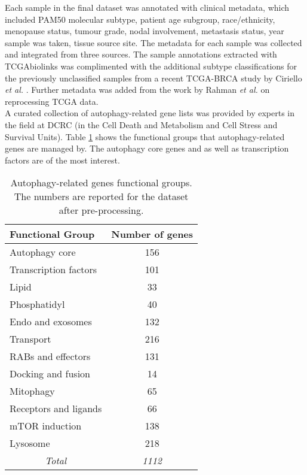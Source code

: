     
    Each sample in the final dataset was annotated with clinical metadata, which included PAM50 molecular subtype, patient age subgroup, race/ethnicity, menopause status, tumour grade, nodal involvement, metastasis status, year sample was taken, tissue source site. 
    The metadata for each sample was collected and integrated from three sources. The sample annotations extracted with TCGAbiolinks was complimented with the additional subtype classifications for the previously unclassified samples from a recent TCGA-BRCA study by Ciriello \textit{et al.} \cite{Ciriello2015ComprehensiveCancer}. Further metadata was added from the work by Rahman \textit{et al. }\cite{RahmanAlternativeResults} on reprocessing TCGA data. \\   
    
        
    A curated collection of autophagy-related gene lists was provided by experts in the field at DCRC (in the Cell Death and Metabolism and Cell Stress and Survival Units). Table \ref{table:autophagy} shows the functional groups that autophagy-related genes are managed by. The autophagy core genes and as well as transcription factors are of the most interest. 
    
    
            \begin{table}[!htbp]
            \centering
            \caption{Autophagy-related genes functional groups. The numbers are reported for the dataset after pre-processing.}
            \label{table:autophagy}
            \begin{tabular}{l|c}
            \textbf{Functional Group} & \multicolumn{1}{l}{\textbf{Number of genes}} \\ \hline
            Autophagy core & 156 \\ \hline
            Transcription factors & 101 \\ \hline
            Lipid & 33 \\ \hline
            Phosphatidyl & 40 \\ \hline
            Endo and exosomes & 132 \\ \hline
            Transport & 216 \\ \hline
            RABs and effectors & 131 \\ \hline
            Docking and fusion & 14 \\ \hline
            Mitophagy & 65 \\ \hline
            Receptors and ligands & 66 \\ \hline
            mTOR induction & 138 \\ \hline
            Lysosome & 218 \\ \hline
            \multicolumn{1}{c|}{\textit{Total}} & \textit{1112}
            \end{tabular}
            \end{table}
            
